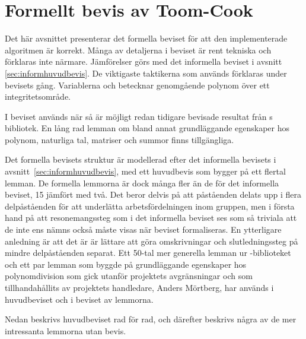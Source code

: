 \section{Formellt bevis av Toom-Cook}
\label{sec:formellbevis}
Det här avsnittet presenterar det formella beviset för att den implementerade
algoritmen är korrekt. Många av detaljerna i beviset är rent tekniska och
förklaras inte närmare. Jämförelser görs med det informella beviset i avsnitt
\ref{sec:informhuvudbevis}. De viktigaste taktikerna som används förklaras under
bevisets gång. Variablerna  och  betecknar genomgående polynom över
ett integritetsområde.

I beviset används när så är möjligt redan tidigare bevisade resultat från \ssr{}
s bibliotek. En lång rad lemman om bland annat grundläggande egenskaper hos
polynom, naturliga tal, matriser och summor finns tillgängliga.

Det formella bevisets struktur är modellerad efter det informella bevisets i
avsnitt~\ref{sec:informhuvudbevis}, med ett huvudbevis som bygger på ett
flertal lemman. De formella lemmorna är dock många fler än de för det
informella beviset, 15 jämfört med två. Det beror delvis på att påståenden
delats upp i flera delpåståenden för att underlätta arbetsfördelningen inom
gruppen, men i första hand på att resonemangssteg som i det informella beviset
ses som så triviala att de inte ens nämns också måste visas när beviset
formaliseras. En ytterligare anledning är att det är är lättare att göra
omskrivningar och slutledningssteg på mindre delpåståenden separat. Ett 50-tal
mer generella lemman ur \ssr{}-biblioteket och ett par lemman som byggde på
grundläggande egenskaper hos polynomdivision som gick utanför projektets
avgränsningar och som tillhandahållits av projektets handledare, Anders
Mörtberg, har används i huvudbeviset och i beviset av lemmorna.

Nedan beskrivs huvudbeviset rad för rad, och därefter beskrivs några av de mer
intressanta lemmorna utan bevis.

